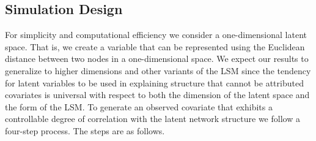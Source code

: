 \documentclass[11pt]{article}
\begin{document}
\subsection{Simulation Design}

For simplicity and computational efficiency we consider a one-dimensional latent space. That is, we create a variable that can be represented using the Euclidean distance between two nodes in a one-dimensional space. We expect our results to generalize to higher dimensions and other variants of the LSM since the tendency for latent variables to be used in explaining structure that cannot be attributed covariates is universal with respect to both the dimension of the latent space and the form of the LSM. To generate an observed covariate that exhibits a controllable degree of correlation with the latent network structure we follow a four-step process. The steps are as follows.
\end{document}
